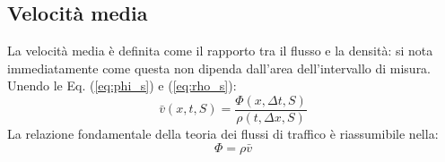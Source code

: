 \documentclass[../main.tex]{subfiles}
\begin{document}
\subsection{Velocit\`a media}
La velocit\`a media \`e definita come il rapporto tra il flusso e la densit\`a: si nota immediatamente come questa non dipenda dall'area dell'intervallo di misura.
Unendo le Eq. (\ref{eq:phi_s}) e (\ref{eq:rho_s}):
\begin{equation}
    \bar{v}(x, t, S)=\frac{\Phi(x, \Delta t, S)}{\rho(t,\Delta x, S)}
\end{equation}
La relazione fondamentale della teoria dei flussi di traffico \`e riassumibile nella:
\begin{equation}
    \Phi=\rho\bar{v}
    \label{eq:fundamental}
\end{equation}
\end{document}
